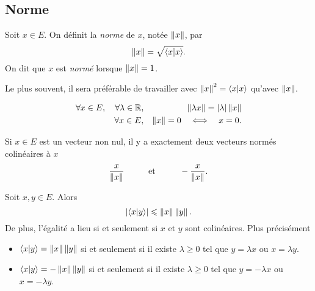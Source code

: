 \documentclass{magnolia}
\begin{document}
\subsection{Norme}

\begin{definition}[utile=-3]
Soit $x\in E$. On définit la \emph{norme} de $x$, notée $\left\|x\right\|$, par
\[\left\|x\right\|=\sqrt{\left\langle {x}\middle|{x}\right\rangle}.\]
On dit que $x$ est \emph{normé} lorsque $\left\|x\right\|=1$.
\end{definition}

\begin{remarqueUnique}
\remarque Le plus souvent, il sera préférable de travailler avec $\left\|x\right\|^2=\left\langle {x}\middle|{x}\right\rangle$
  qu'avec $\left\|x\right\|$.
\end{remarqueUnique}

\begin{proposition}[utile=-3]
\begin{eqnarray*}
\forall x\in E ,\quad \forall\lambda\in\mathbb{R}, & & \left\|\lambda x\right\|=
  \left|\lambda\right|\left\|x\right\|\\
\forall x\in E, & & \left\|x\right\|=0 \quad\Longleftrightarrow\quad x=0.
\end{eqnarray*}
\end{proposition}

\begin{remarqueUnique}
  \remarque Si $x\in E$ est un vecteur non nul, il y a exactement deux vecteurs 
    normés colinéaires à $x$
    \[\frac{x}{\left\|x\right\|} \qquad\quad\!\text{et}\quad\!\qquad -\frac{x}{\left\|x\right\|}.\]
  \end{remarqueUnique}

\begin{proposition}[utile=3, nom=Inégalité de \nom{Cauchy-Schwarz}]
Soit $x,y\in E$. Alors
\[\left|\left\langle {x}\middle|{y}\right\rangle\right|\leqslant\left\|x\right\|\left\|y\right\|.\]
De plus, l'égalité a lieu si et seulement si $x$ et $y$ sont colinéaires.  Plus précisément
\begin{itemize}
\item $\left\langle {x}\middle|{y}\right\rangle=\left\|x\right\|\left\|y\right\|$ si et seulement si il existe $\lambda\geq 0$ tel que
$y=\lambda x$ ou $x=\lambda y$.
\item $\left\langle {x}\middle|{y}\right\rangle=-\left\|x\right\|\left\|y\right\|$ si et seulement si il existe
$\lambda\geq 0$ tel que $y=-\lambda x$  ou $x=-\lambda y$.
\end{itemize}
\end{proposition}
\end{document}
